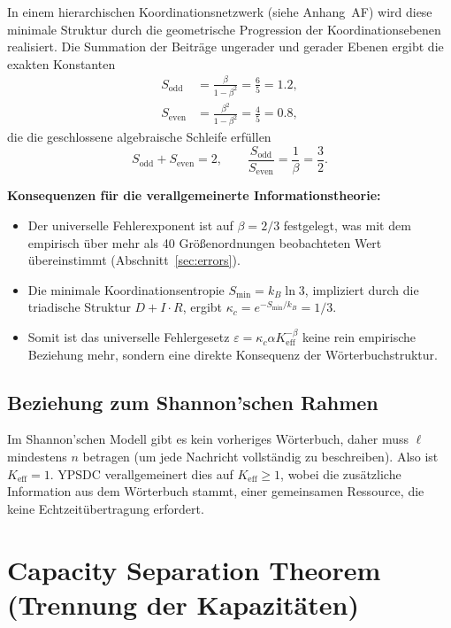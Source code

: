 \documentclass[12pt,a4paper]{article}
\theoremstyle{remark}
\newcommand{\Keff}{K_{\mathrm{eff}}}
\begin{document}
	In einem hierarchischen Koordinationsnetzwerk (siehe Anhang~AF) wird diese minimale Struktur durch die geometrische Progression der Koordinationsebenen realisiert. Die Summation der Beiträge ungerader und gerader Ebenen ergibt die exakten Konstanten
	\begin{align}
		S_{\mathrm{odd}} &= \frac{\beta}{1-\beta^{2}} = \frac{6}{5} = 1.2, \label{eq:sodd-appx}\\
		S_{\mathrm{even}} &= \frac{\beta^{2}}{1-\beta^{2}} = \frac{4}{5} = 0.8, \label{eq:seven-appx}
	\end{align}
	die die geschlossene algebraische Schleife erfüllen
	\begin{equation}
		S_{\mathrm{odd}} + S_{\mathrm{even}} = 2, \qquad
		\frac{S_{\mathrm{odd}}}{S_{\mathrm{even}}} = \frac{1}{\beta} = \frac{3}{2}.
		\label{eq:algebraic-loop-appx}
	\end{equation}
	
	\textbf{Konsequenzen für die verallgemeinerte Informationstheorie:}
	\begin{itemize}
		\item Der universelle Fehlerexponent ist auf \(\beta = 2/3\) festgelegt, was mit dem empirisch über mehr als 40 Größenordnungen beobachteten Wert übereinstimmt (Abschnitt~\ref{sec:errors}).
		\item Die minimale Koordinationsentropie \(S_{\min} = k_B \ln 3\), impliziert durch die triadische Struktur \(D+I\!\cdot\!R\), ergibt \(\kappa_c = e^{-S_{\min}/k_B} = 1/3\).
		\item Somit ist das universelle Fehlergesetz \(\varepsilon = \kappa_c \alpha K_{\mathrm{eff}}^{-\beta}\) keine rein empirische Beziehung mehr, sondern eine direkte Konsequenz der Wörterbuchstruktur.
	\end{itemize}
	
	\subsection{Beziehung zum Shannon'schen Rahmen}
	
	Im Shannon'schen Modell gibt es kein vorheriges Wörterbuch, daher muss $\ell$ mindestens $n$ betragen (um jede Nachricht vollständig zu beschreiben). Also ist $\Keff = 1$. YPSDC verallgemeinert dies auf $\Keff \ge 1$, wobei die zusätzliche Information aus dem Wörterbuch stammt, einer gemeinsamen Ressource, die keine Echtzeitübertragung erfordert.
	
	\section{Capacity Separation Theorem (Trennung der Kapazitäten)}
	\label{sec:separation}
	
\end{document}
